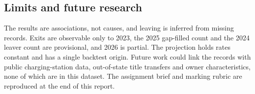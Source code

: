 \documentclass{xmum_asg}
\begin{document}
\subsection{Limits and future research}

The results are associations, not causes, and leaving is inferred from missing records. Exits are observable only to 2023, the 2025 gap-filled count and the 2024 leaver count are provisional, and 2026 is partial. The projection holds rates constant and has a single backtest origin. Future work could link the records with public charging-station data, out-of-state title transfers and owner characteristics, none of which are in this dataset. The assignment brief and marking rubric are reproduced at the end of this report.


\FloatBarrier

\label{LastMainPage}
\clearpage

\pagestyle{empty}

{}


\end{document}
